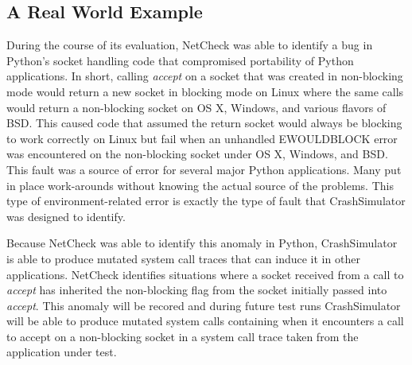     \subsection{A Real World Example}

        During the course of its evaluation, NetCheck was able to identify a bug in Python's socket handling code that
        compromised portability of Python applications. In short, calling \emph{accept} on a socket that was created in
        non-blocking mode would return a new socket in blocking mode on Linux where the same calls would return a
        non-blocking socket on OS X, Windows, and various flavors of BSD\@. This caused code that assumed the return
        socket would always be blocking to work correctly on Linux but fail when an unhandled EWOULDBLOCK error was
        encountered on the non-blocking socket under OS X, Windows, and BSD\@. This fault was a source of error for
        several major Python applications. Many put in place work-arounds without knowing the actual source of the
        problems.  This type of environment-related error is exactly the type of fault that CrashSimulator was designed
        to identify.

        Because NetCheck was able to identify this anomaly in Python, CrashSimulator is able to produce mutated system
        call traces that can induce it in other applications. NetCheck identifies situations where a socket received
        from a call to \emph{accept} has inherited the non-blocking flag from the socket initially passed into
        \emph{accept}. This anomaly will be recored and during future test runs CrashSimulator will be able to produce
        mutated system calls containing when it encounters a call to accept on a non-blocking socket in a system call
        trace taken from the application under test.
